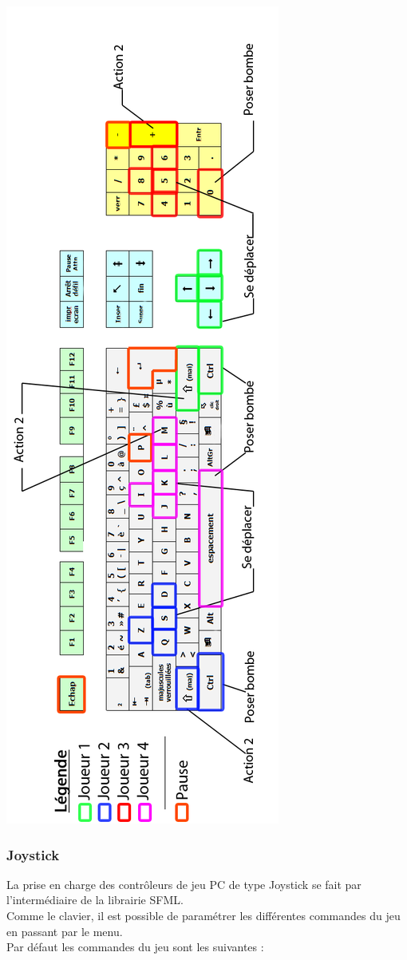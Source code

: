\begin{center}
	\includegraphics[scale=0.4]{images/clavier}
\end{center}

\subsubsection{Joystick}
La prise en charge des contrôleurs de jeu PC de type Joystick se fait par l'intermédiaire de la librairie SFML.\\
Comme le clavier, il est possible de paramétrer les différentes commandes du jeu en passant par le menu.\\
Par défaut les commandes du jeu sont les suivantes :\\

